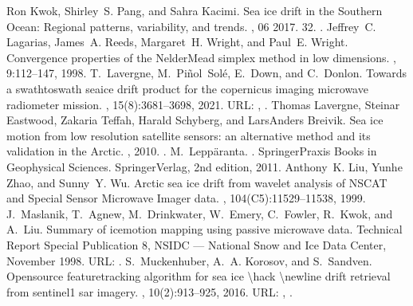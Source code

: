 \documentclass[letterpaper,10pt,english]{jupyterBook}
\begin{document}
\begin{sphinxthebibliography}{10}
\sphinxAtStartPar
Ron Kwok, Shirley S. Pang, and Sahra Kacimi. Sea ice drift in the Southern Ocean: Regional patterns, variability, and trends. , 06 2017. 32. .
\sphinxAtStartPar
Jeffrey C. Lagarias, James A. Reeds, Margaret H. Wright, and Paul E. Wright. Convergence properties of the Nelder\sphinxhyphen{}Mead simplex method in low dimensions. , 9:112–147, 1998.
\sphinxAtStartPar
T. Lavergne, M. Piñol Solé, E. Down, and C. Donlon. Towards a swath\sphinxhyphen{}to\sphinxhyphen{}swath sea\sphinxhyphen{}ice drift product for the copernicus imaging microwave radiometer mission. , 15(8):3681–3698, 2021. URL: , .
\sphinxAtStartPar
Thomas Lavergne, Steinar Eastwood, Zakaria Teffah, Harald Schyberg, and Lars\sphinxhyphen{}Anders Breivik. Sea ice motion from low resolution satellite sensors: an alternative method and its validation in the Arctic. , 2010. .
\sphinxAtStartPar
M. Leppäranta. . Springer\sphinxhyphen{}Praxis Books in Geophysical Sciences. Springer\sphinxhyphen{}Verlag, 2nd edition, 2011.
\sphinxAtStartPar
Anthony K. Liu, Yunhe Zhao, and Sunny Y. Wu. Arctic sea ice drift from wavelet analysis of NSCAT and Special Sensor Microwave Imager data. , 104(C5):11529–11538, 1999.
\sphinxAtStartPar
J. Maslanik, T. Agnew, M. Drinkwater, W. Emery, C. Fowler, R. Kwok, and A. Liu. Summary of ice\sphinxhyphen{}motion mapping using passive microwave data. Technical Report Special Publication 8, NSIDC — National Snow and Ice Data Center, November 1998. URL: .
\sphinxAtStartPar
S. Muckenhuber, A. A. Korosov, and S. Sandven. Open\sphinxhyphen{}source feature\sphinxhyphen{}tracking algorithm for sea ice \textbackslash{}hack \textbackslash{}newline  drift retrieval from sentinel\sphinxhyphen{}1 sar imagery. , 10(2):913–925, 2016. URL: , .

\end{sphinxthebibliography}
\end{document}
